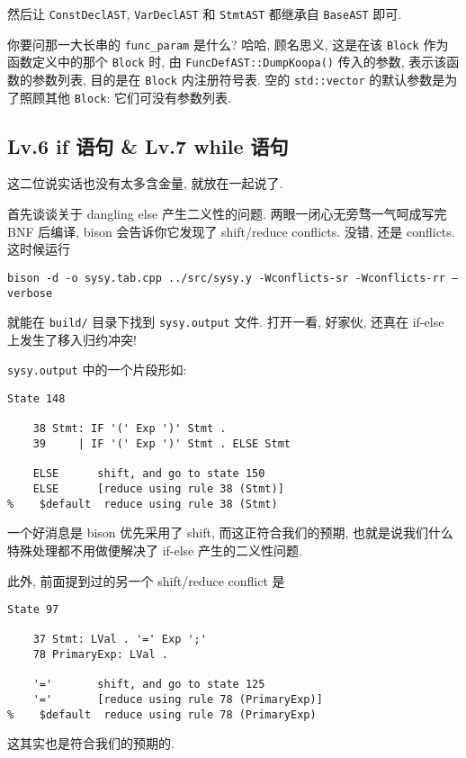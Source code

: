 \documentclass[8pt]{article}
\theoremstyle{compact}
\begin{document}
然后让 \texttt{ConstDeclAST}, \texttt{VarDeclAST} 和 \texttt{StmtAST} 都继承自 \texttt{BaseAST} 即可.

你要问那一大长串的 \texttt{func\_param} 是什么? 哈哈, 顾名思义, 这是在该 \texttt{Block} 作为函数定义中的那个 \texttt{Block} 时, 由 \texttt{FuncDefAST::DumpKoopa()} 传入的参数, 表示该函数的参数列表, 目的是在 \texttt{Block} 内注册符号表. 空的 \texttt{std::vector} 的默认参数是为了照顾其他 \texttt{Block}: 它们可没有参数列表.

\subsection{Lv.6 if 语句 \& Lv.7 while 语句}

这二位说实话也没有太多含金量, 就放在一起说了.

首先谈谈关于 dangling else 产生二义性的问题. 两眼一闭心无旁骛一气呵成写完 BNF 后编译, bison 会告诉你它发现了 shift/reduce conflicts. 没错, 还是 conflicts. 这时候运行 

\texttt{bison -d -o sysy.tab.cpp ../src/sysy.y -Wconflicts-sr -Wconflicts-rr {\color{red}--verbose}}

\noindent 就能在 \texttt{build/} 目录下找到 \texttt{sysy.output} 文件. 打开一看, 好家伙, 还真在 if-else 上发生了移入归约冲突!

\texttt{sysy.output} 中的一个片段形如: \begin{verbatim}
State 148

    38 Stmt: IF '(' Exp ')' Stmt .
    39     | IF '(' Exp ')' Stmt . ELSE Stmt
 
    ELSE      shift, and go to state 150
    ELSE      [reduce using rule 38 (Stmt)]
%    $default  reduce using rule 38 (Stmt)     
\end{verbatim}

一个好消息是 bison 优先采用了 shift, 而这正符合我们的预期, 也就是说我们什么特殊处理都不用做便解决了 if-else 产生的二义性问题.

此外, 前面提到过的另一个 shift/reduce conflict 是 \begin{verbatim}
State 97

    37 Stmt: LVal . '=' Exp ';'
    78 PrimaryExp: LVal .

    '='       shift, and go to state 125
    '='       [reduce using rule 78 (PrimaryExp)]
%    $default  reduce using rule 78 (PrimaryExp)
\end{verbatim}

这其实也是符合我们的预期的.
\end{document}
